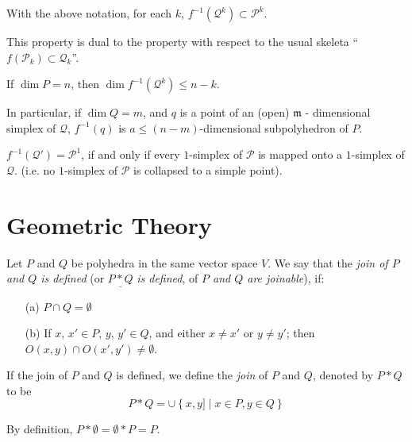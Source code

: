 \setcounter{proposition}{12}
\begin{proposition}\label{chap4-prop4.2.13}
With the above notation, for each $k$, $f^{-1}(\mathcal{Q}^{k})\subset \mathscr{P}^{k}$.
\end{proposition}

This property is dual to the property with respect to the usual skeleta ``$f(\mathscr{P}_{k})\subset \mathcal{Q}_{k}$''.

\begin{corollary}\label{chap4-coro4.2.14}
If $\dim P=n$, then $\dim f^{-1}(\mathcal{Q}^{k})\leq n-k$.
\end{corollary}

In particular, if $\dim Q=m$, and $q$ is a point of an (open)
$\mathfrak{m}$ - dimensional simplex of $\mathcal{Q}$, $f^{-1}(q)$ is $a\leq (n-m)$-dimensional subpolyhedron of $P$.

\begin{ex}\label{chap4-ex4.2.15}
$f^{-1}(\mathcal{Q}')=\mathscr{P}^{1}$, if and only if every $1$-simplex of $\mathscr{P}$ is mapped onto a $1$-simplex of $\mathcal{Q}$. (i.e. no $1$-simplex of $\mathscr{P}$ is collapsed to a simple point).
\end{ex}

\section{Geometric Theory}\pageoriginale\label{chap4-sec4.3}

\begin{definition}\label{chap4-defi4.3.1}
Let $P$ and $Q$ be polyhedra in the same vector space $V$. We say that the {\em join of $P$ and $Q$ is defined} (or $\underline{P\ast Q}$ {\em is defined}, of {\em $P$ and $Q$ are joinable}), if:
\begin{itemize}
\item[(a)] $P\cap Q=\emptyset$

\item[(b)] If $x$, $x'\in P$, $y$, $y'\in Q$, and either $x\neq x'$ or $y\neq y'$; then $O(x,y)\cap O(x',y')\neq \emptyset$. 
\end{itemize}

If the join of $P$ and $Q$ is defined, we define the {\em join} of $P$ and $Q$, denoted by $P\ast Q$ to be
$$
P\ast Q=\cup \left\{x,y]\mid x\in P, y\in Q\right\}
$$
\end{definition}

By definition, $P\ast\emptyset=\emptyset\ast P=P$.

